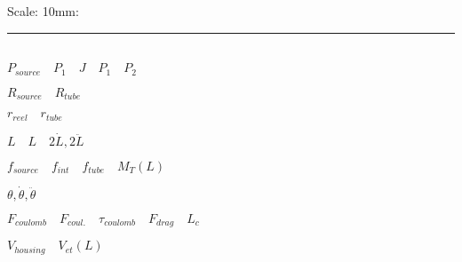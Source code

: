 \documentclass[letterpaper]{article}
\begin{document}
\doublespacing
Scale:  10mm:   \rule{10mm}{1mm}\\
\vspace{.25in}
$P_{source} \quad P_1  \quad  J   \quad P_1  \quad P_2 $

$R_{source} \quad R_{tube} $

$r_{reel} \quad r_{tube} $

$L \quad L \quad 2\dot{L}, 2\ddot{L}$

$f_{source} \quad f_{int} \quad f_{tube} \quad M_T(L) \quad $

$\theta, \dot{\theta}, \ddot{\theta} $


$F_{coulomb} \quad F_{coul.} \quad \tau_{coulomb} \quad F_{drag} \quad L_c  $

$V_{housing}\quad V_{et}(L) $
\end{document}
